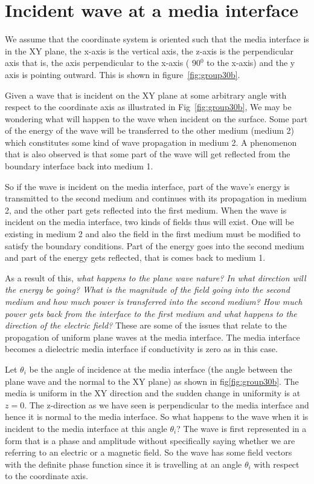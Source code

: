 \section{Incident wave at a media interface}
We assume that the coordinate system is oriented such that the media interface is in the XY plane, the x-axis is the vertical axis, the z-axis is the perpendicular axis that is, the axis perpendicular to the x-axis ( 90$^{0}$ to the x-axis) and the y axis is pointing outward. This is shown in figure~\ref{fig:group30b}.

Given a wave that is incident on the XY plane at some arbitrary angle with respect to the coordinate axis as illustrated in Fig~\ref{fig:group30b}, We may be wondering what will happen to the wave when incident on the surface. Some part of the energy of the wave will be transferred to the other medium (medium 2) which constitutes some kind of wave propagation in medium 2. A phenomenon that is also observed is that some part of the wave will get reflected from the boundary interface back into medium 1.

So if the wave is incident on the media interface, part of the wave's energy is transmitted to the second medium and continues with its propagation in medium 2, and the other part gets reflected into the first medium. When the wave is incident on the media interface, two kinds of fields thus will exist. One will be existing in medium 2 and also the field in the first medium must be modified to satisfy the boundary conditions. Part of the energy goes into the second medium and part of the energy gets reflected, that is comes back to medium 1.

As a result of this, \emph{what happens to the plane wave nature? In what direction will the energy be going? What is the magnitude of the field going into the second medium and how much power is transferred into the second medium? How much power gets back from the interface to the first medium and what happens to the direction of the electric field?} These are some of the issues that relate to the propagation of uniform plane waves at the media interface. The media interface becomes a dielectric media interface if conductivity is zero as in this case.

Let $\theta_i$ be the angle of incidence at the media interface (the angle between the plane wave and the normal to the XY plane) as shown in fig\ref{fig:group30b}. The media is uniform in the XY direction and the sudden change in uniformity is at $z=0$. The z-direction as we have seen is perpendicular to the media interface and hence it is normal to the media interface. So what happens to the wave when it is incident to the media interface at this angle $\theta_i$? The wave is first represented in a form that is a phase and amplitude without specifically saying whether we are referring to an electric or a magnetic field. So the wave has some field vectors with the definite phase function since it is travelling at an angle $\theta_i$ with respect to the coordinate axis.	


